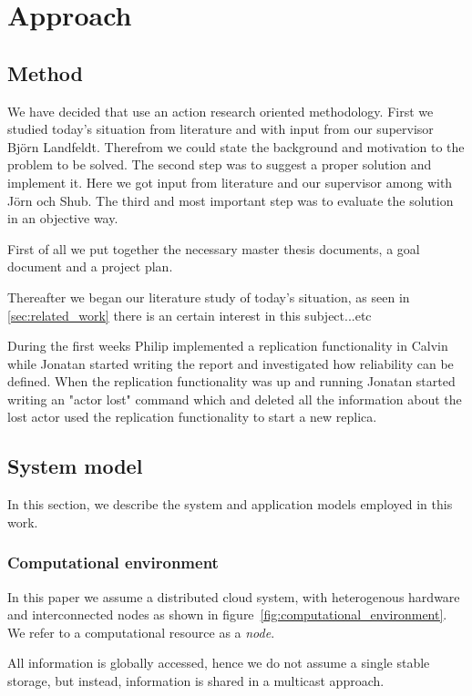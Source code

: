 \documentclass{cslthse-msc}
\begin{document}
\chapter{Approach} \label{ch:approach}

\section{Method} \label{sec:method}
We have decided that use an action research oriented methodology. First we studied today's situation from literature and with input from our supervisor Björn Landfeldt. Therefrom we could state the background and motivation to the problem to be solved.
The second step was to suggest a proper solution and implement it. Here we got input from literature and our supervisor among with Jörn och Shub. The third and most important step was to evaluate the solution in an objective way. %

First of all we put together the necessary master thesis documents, a goal document and a project plan. 

Thereafter we began our literature study of today's situation, as seen in \ref{sec:related_work} there is an certain interest in this subject...etc

During the first weeks Philip implemented a replication functionality in Calvin while Jonatan started writing the report and investigated how reliability can be defined. When the replication functionality was up and running Jonatan started writing an "actor lost" command which and deleted all the information about the lost actor used the replication functionality to start a new replica.
\section{System model}
In this section, we describe the system and application models employed in this work.

\subsection{Computational environment}
In this paper we assume a distributed cloud system, with heterogenous hardware and interconnected nodes as shown in figure~\ref{fig:computational_environment}. We refer to a computational resource as a \emph{node}.

All information is globally accessed, hence we do not assume a single stable storage, but instead, information is shared in a multicast approach.
\end{document}
